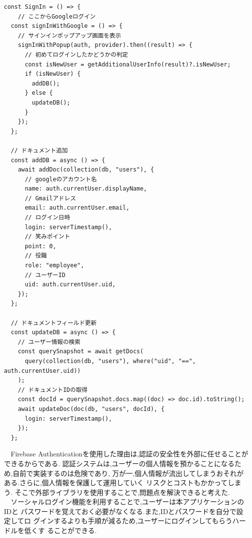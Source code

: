 \begin{lstlisting}[caption=Googleログインの実装]
  const SignIn = () => {
    // ここからGoogleログイン
  const signInWithGoogle = () => {
    // サインインポップアップ画面を表示
    signInWithPopup(auth, provider).then((result) => {
      // 初めてログインしたかどうかの判定
      const isNewUser = getAdditionalUserInfo(result)?.isNewUser;
      if (isNewUser) {
        addDB();
      } else {
        updateDB();
      }
    });
  };

  // ドキュメント追加
  const addDB = async () => {
    await addDoc(collection(db, "users"), {
      // googleのアカウント名
      name: auth.currentUser.displayName,
      // Gmailアドレス
      email: auth.currentUser.email,
      // ログイン日時
      login: serverTimestamp(),
      // 笑みポイント
      point: 0,
      // 役職
      role: "employee",
      // ユーザーID
      uid: auth.currentUser.uid,
    });
  };

  // ドキュメントフィールド更新
  const updateDB = async () => {
    // ユーザー情報の検索
    const querySnapshot = await getDocs(
      query(collection(db, "users"), where("uid", "==", auth.currentUser.uid))
    );
    // ドキュメントIDの取得
    const docId = querySnapshot.docs.map((doc) => doc.id).toString();
    await updateDoc(doc(db, "users", docId), {
      login: serverTimestamp(),
    });
  };
\end{lstlisting}

\vspace{12mm}

　Firebase Authenticationを使用した理由は,認証の安全性を外部に任せることができるからである.
認証システムは,ユーザーの個人情報を預かることになるため,自前で実装するのは危険であり,
万が一,個人情報が流出してしまうおそれがある.さらに,個人情報を保護して運用していく
リスクとコストもかかってしまう.
そこで外部ライブラリを使用することで,問題点を解決できると考えた. \\
　ソーシャルログイン機能を利用することで,ユーザーは本アプリケーションのIDと
パスワードを覚えておく必要がなくなる.また,IDとパスワードを自分で設定してロ
グインするよりも手順が減るため,ユーザーにログインしてもらうハードルを低くす
ることができる. \\
　

